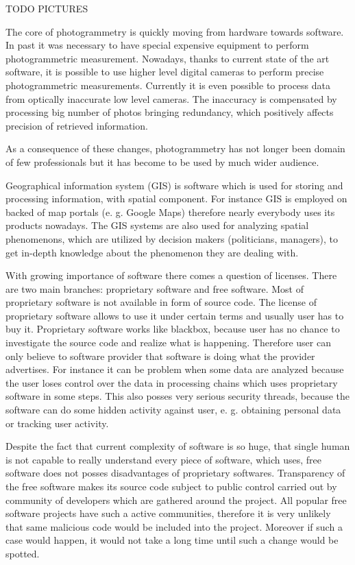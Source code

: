 \documentclass[a4paper,12pt]{article}
\begin{document}
TODO PICTURES


The core of photogrammetry is quickly moving  from  hardware towards software. In past it was necessary to have special 
expensive equipment to perform photogrammetric measurement. Nowadays, thanks to current state of the art software, 
 it is possible to use higher level digital cameras to perform precise photogrammetric measurements. 
 Currently it is even possible to process data from optically inaccurate low level cameras.
 The inaccuracy is compensated by processing big number of photos bringing redundancy, 
 which positively affects precision of retrieved information.
 
As a consequence of these changes, photogrammetry has not longer been domain of few professionals but it has 
become to be used by much wider audience. 

Geographical information system (GIS) is software which is used for storing and processing information,
with spatial component. For instance  GIS is employed on backed of map portals (e. g. Google Maps) therefore nearly 
everybody uses its products nowadays. 
The GIS systems are also used for analyzing spatial phenomenons, which
are utilized by decision makers (politicians, managers), to get in-depth knowledge about the 
phenomenon they are dealing with.

With growing importance of software there comes a question of licenses. There are two 
main branches: proprietary software and free software. Most of proprietary software is not available in 
form of source code. The license of proprietary software allows to use it under certain terms and usually user 
has to buy it. Proprietary software works like blackbox, because user has no chance to investigate the source 
code and realize what is happening. Therefore user can only believe to software provider
that software is doing what the provider advertises. 
For instance it can be problem when some data are analyzed
because the user loses control 
over the data in processing chains which uses proprietary software in some steps.
This also posses very serious security threads, because the software can do some hidden activity against user,
e. g. obtaining personal data or tracking user activity.

Despite the fact that current complexity of software is so huge,
that single human is not capable to really understand every piece of software, which uses,
free software does not posses disadvantages of proprietary softwares.
Transparency of the free software makes its source code subject to public control 
carried out by community of developers which are gathered around the project.
All popular free software projects have such a active communities, therefore it is
very unlikely that same malicious code would be included into the project.
Moreover if such a case would happen, it would not take a long time until such a change 
would be spotted.
\end{document}
